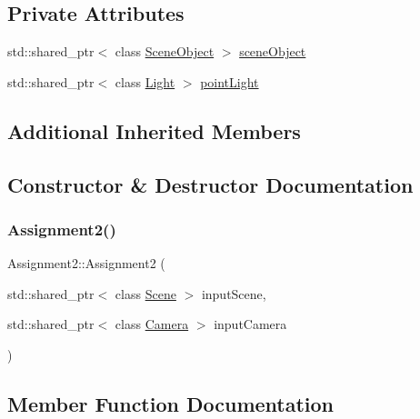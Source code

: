 \subsection*{Private Attributes}
\begin{DoxyCompactItemize}
\item
std\+::shared\+\_\+ptr$<$ class \hyperlink{class_scene_object}{Scene\+Object} $>$ \hyperlink{class_assignment2_a3afcc7cf71f0b1eb855482057beb1146}{scene\+Object}
\item
std\+::shared\+\_\+ptr$<$ class \hyperlink{class_light}{Light} $>$ \hyperlink{class_assignment2_abaf6127e0de097717673c0d9b04f8c79}{point\+Light}
\end{DoxyCompactItemize}
\subsection*{Additional Inherited Members}


\subsection{Constructor \& Destructor Documentation}
\hypertarget{class_assignment2_ac684d2ecb894a4e71f8359e3a2ebd37f}{}\label{class_assignment2_ac684d2ecb894a4e71f8359e3a2ebd37f}
\subsubsection{\texorpdfstring{Assignment2()}{Assignment2()}}
{\footnotesize\ttfamily Assignment2\+::\+Assignment2 (\begin{DoxyParamCaption}\item[{std\+::shared\+\_\+ptr$<$ class \hyperlink{class_scene}{Scene} $>$}]{input\+Scene,  }\item[{std\+::shared\+\_\+ptr$<$ class \hyperlink{class_camera}{Camera} $>$}]{input\+Camera }\end{DoxyParamCaption})}



\subsection{Member Function Documentation}
\hypertarget{class_assignment2_ae4f0035275d5be2c053a598fbe3209e6}{}\label{class_assignment2_ae4f0035275d5be2c053a598fbe3209e6}
